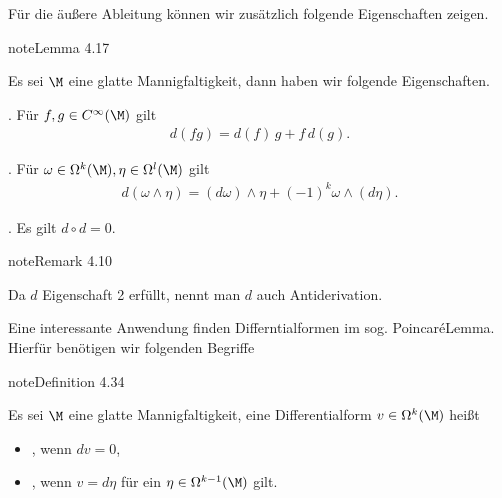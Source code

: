 \documentclass[letterpaper,10pt,english]{jupyterBook}
\begin{document}
\sphinxAtStartPar
Für die äußere Ableitung können wir zusätzlich folgende Eigenschaften zeigen.
\label{manifolds/diffformen:lem:outeprop}
\begin{sphinxadmonition}{note}{Lemma 4.17}



\sphinxAtStartPar
Es sei \(\M\) eine glatte Mannigfaltigkeit, dann haben wir folgende Eigenschaften.



. Für \(f,g\in C^\infty(\M)\) gilt
\begin{equation*}
\begin{split}d(fg) = d(f)\,g + f\, d(g).\end{split}
\end{equation*}


. Für \(\omega\in\Omega^k(\M),\eta\in\Omega^l(\M)\) gilt
\begin{equation*}
\begin{split}d(\omega\wedge\eta) = (d\omega)\wedge \eta + (-1)^k \omega\wedge (d\eta).\end{split}
\end{equation*}


. Es gilt \(d\circ d = 0\).
\end{sphinxadmonition}
\label{manifolds/diffformen:remark-9}
\begin{sphinxadmonition}{note}{Remark 4.10}



\sphinxAtStartPar
Da \(d\) Eigenschaft 2 erfüllt, nennt man \(d\) auch Antiderivation.
\end{sphinxadmonition}

\sphinxAtStartPar
Eine interessante Anwendung finden Differntialformen im sog. Poincaré\sphinxhyphen{}Lemma. Hierfür benötigen wir folgenden Begriffe
\label{manifolds/diffformen:def:geschlossenexakt}
\begin{sphinxadmonition}{note}{Definition 4.34}



\sphinxAtStartPar
Es sei \(\M\) eine glatte Mannigfaltigkeit, eine Differentialform \(v\in\Omega^k(\M)\) heißt
\begin{itemize}
\item {} 
\sphinxAtStartPar
{}, wenn \(dv=0\),

\item {} 
\sphinxAtStartPar
{}, wenn \(v=d\eta\) für ein \(\eta\in\Omega^{k-1}(\M)\) gilt.

\end{itemize}
\end{sphinxadmonition}
\end{document}
